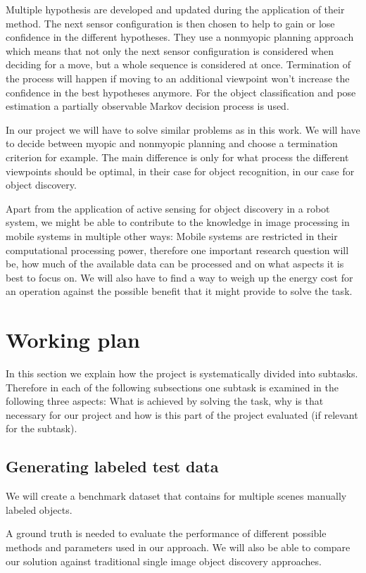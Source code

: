 \documentclass[a4paper,11pt,english]{article}
\begin{document}
Multiple hypothesis are developed and updated during the application of their method. The next sensor configuration is then chosen to help to gain or lose confidence in the different hypotheses.
They use a nonmyopic planning approach which means that not only the next sensor configuration is considered when deciding for a move, but a whole sequence is considered at once. 
Termination of the process will happen if moving to an additional viewpoint won't increase the confidence in the best hypotheses anymore.
For the object classification and pose estimation a partially observable Markov decision process is used.

In our project we will have to solve similar problems as in this work.
We will have to decide between myopic and nonmyopic planning and choose a termination criterion for example. The main difference is only for what process the different viewpoints should be optimal, in their case for object recognition, in our case for object discovery.\medskip

Apart from the application of active sensing for object discovery in a robot system, we might be able to contribute to the knowledge in image processing in mobile systems in multiple other ways:
Mobile systems are restricted in their computational processing power, therefore one important research question will be, how much of the available data can be processed and on what aspects it is best to focus on. 
We will also have to find a way to weigh up the energy cost for an operation against the possible benefit that it might provide to solve the task.

\section{Working plan}
In this section we explain how the project is systematically divided into subtasks.
Therefore in each of the following subsections one subtask is examined in the following three aspects: What is achieved by solving the task, why is that necessary for our project and how is this part of the project evaluated (if relevant for the subtask).

\subsection{Generating labeled test data}
We will create a benchmark dataset that contains for multiple scenes manually labeled objects.

A ground truth is needed to evaluate the performance of different possible methods and parameters used in our approach. We will also be able to compare our solution against traditional single image object discovery approaches.
\end{document}
